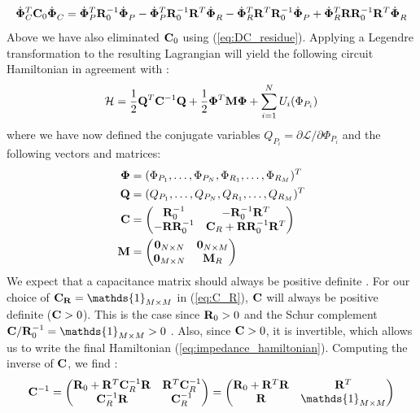 \begin{equation}
    \dot{\vb{\Phi}}_C^T \vb{C}_0 \dot{\vb{\Phi}}_C^{\phantom{^T}} = \dot{\vb{\Phi}}_P^T \vb{R}_0^{-1} \dot{\vb{\Phi}}_P^{\phantom{^T}} - \dot{\vb{\Phi}}_P^{T} \vb{R}_0^{-1} \vb{R}^T \dot{\vb{\Phi}}_R^{\phantom{^T}} - \dot{\vb{\Phi}}_R^{T} \vb{R}^T \vb{R}_0^{-1} \dot{\vb{\Phi}}_P^{\phantom{T}} + \dot{\vb{\Phi}}_R^{T} \vb{R} \vb{R}_0^{-1} \vb{R}^T \dot{\vb{\Phi}}_R^{\phantom{^T}}
\end{equation}
Above we have also eliminated $\vb{C}_0$ using (\ref{eq:DC_residue}). Applying a Legendre transformation to the resulting Lagrangian will yield the following circuit Hamiltonian in agreement with \cite{solgun_sirf}:
\begin{equation}\label{eq:impedance_hamiltonian}
    \mathcal{H} = \frac{1}{2} \vb{Q}^T \vb{C}^{-1} \vb{Q} + \frac{1}{2} \vb{\Phi}^T \vb{M} \vb{\Phi} + \sum_{i=1}^N U_i(\Phi_{P_i})
\end{equation}
where we have now defined the conjugate variables $Q_{P_i} = \partial \mathcal{L}/\partial \Phi_{P_i}$ and the following vectors and matrices:
\begin{align}
    \vb{\Phi} &= (\Phi_{P_1}, \dots, \Phi_{P_N}, \Phi_{R_1}, \dots, \Phi_{R_M})^T \\
    \vb{Q} &= (Q_{P_1}, \dots, Q_{P_N}, Q_{R_1}, \dots, Q_{R_M})^T \\
    \vb{C} &= \mqty( \vb{R}_0^{-1} & -\vb{R}_0^{-1}\vb{R}^T \\ -\vb{R} \vb{R}_0^{-1} & \vb{C}_R + \vb{R}\vb{R}_0^{-1}\vb{R}^T) \label{eq:impedance_cap}\\
    \vb{M} &= \mqty(\vb{0}_{N\times N} & \vb{0}_{N\times M} \\ \vb{0}_{M\times N} & \vb{M}_R)
\end{align}
We expect that a capacitance matrix should always be positive definite \cite{pos_cap}. For our choice of $\vb{C_R} = \mathds{1}_{M\times M}$ in (\ref{eq:C_R}), $\vb{C}$ will always be positive definite ($\vb{C} > 0$). This is the case since $\vb{R}_0 > 0$ and the Schur complement $\vb{C}/\vb{R}_0^{-1}=\mathds{1}_{M\times M} > 0$ \cite[Theorem 1.12]{schur_comp}. Also, since $\vb{C} > 0$, it is invertible, which allows us to write the final Hamiltonian (\ref{eq:impedance_hamiltonian}). Computing the inverse of $\vb{C}$, we find \cite[Proposition 2.8.7]{matrix_mathematics}:
\begin{equation}\label{eq:impedance_cap_inverse}
    \vb{C}^{-1} = \mqty( 
        \vb{R}_0 + \vb{R}^T \vb{C}_R^{-1} \vb{R} & \vb{R}^T \vb{C}_R^{-1} \\ 
        \vb{C}_R^{-1} \vb{R} & \vb{C}_R^{-1}
    ) = 
    \mqty( 
        \vb{R}_0 + \vb{R}^T \vb{R} & \vb{R}^T  \\ 
         \vb{R} & \mathds{1}_{M\times M}
    )
\end{equation}


